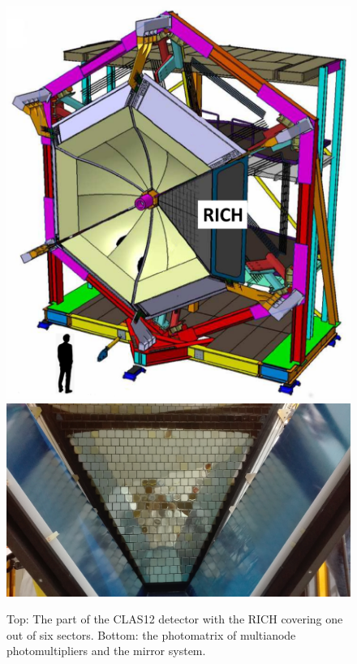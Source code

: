 \begin{figure}[h!bt]
	\centering
	\includegraphics[width=0.95\linewidth]{figures/RICHdetector.pdf}
	\includegraphics[width=0.95\linewidth]{figures/RICHpanel_front.png}
	\caption{Top: The part of the CLAS12 detector with the RICH covering one out of six sectors. Bottom: the photomatrix of multianode photomultipliers and the mirror system.}
	\label{fig:RICHdetector}
\end{figure}


